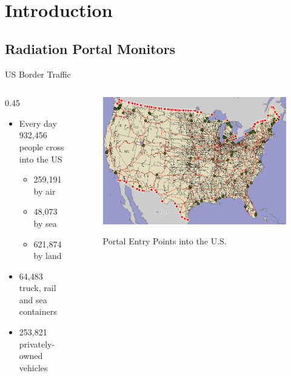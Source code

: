 

\section{Introduction}

\subsection{Radiation Portal Monitors}

\begin{frame}{US Border Traffic}
\begin{columns}[onlytextwidth]
\begin{column} {0.45\textwidth}
 
  \begin{itemize}
  \item Every day 932,456 people cross into the US \cite{cpb_typical_2012}
    \begin{itemize}
    	\item 259,191 by air
	\item 48,073 by sea
	\item 621,874 by land
    \end{itemize}
  \item 64,483 truck, rail and sea containers \cite{cpb_typical_2012}
 \item 253,821 privately-owned vehicles \cite{cpb_typical_2012}
  \end{itemize}
\end{column}
\begin{column}{0.45\textwidth}
\centering
\begin{figure}
		\includegraphics[width=\textwidth]{images/PortalEntryMap.eps}
		\label{fig:PortalEntryMap}
	\caption{Portal Entry Points into the U.S.}
\end{figure}
\end{column}
\end{columns}
\end{frame}

